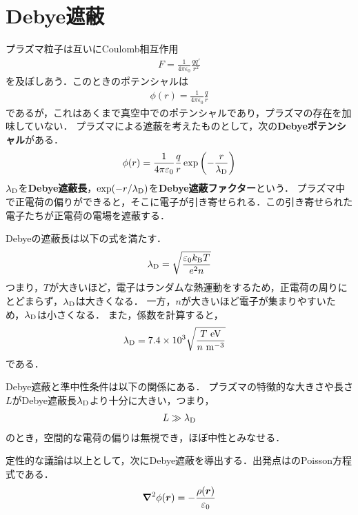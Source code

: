 \documentclass{report}
\begin{document}
  \section{Debye遮蔽}
    プラズマ粒子は互いにCoulomb相互作用
    \begin{align}
      F = \frac{1}{4\pi \epsilon_0}\frac{qq'}{r^2}
    \end{align}
    を及ぼしあう．このときのポテンシャルは
    \begin{align}
      \phi(r) = \frac{1}{4\pi \epsilon_0}\frac{q}{r}
    \end{align}
    であるが，これはあくまで真空中でのポテンシャルであり，プラズマの存在を加味していない．
    プラズマによる遮蔽を考えたものとして，次の\textbf{Debyeポテンシャル}がある．
    \begin{align}
      \phi(r) = \frac{1}{4\pi\varepsilon_0}\frac{q}{r}\exp\qty(-\frac{r}{\lambda_{\mathrm{D}}})
    \end{align}
    $\lambda_{\mathrm{D}}$を\textbf{Debye遮蔽長}，$\exp(-r/\lambda_{\mathrm{D}})$を\textbf{Debye遮蔽ファクター}という．
    プラズマ中で正電荷の偏りができると，そこに電子が引き寄せられる．この引き寄せられた電子たちが正電荷の電場を遮蔽する．
    \par
    Debyeの遮蔽長は以下の式を満たす．
    \begin{align}
      \lambda_{\mathrm{D}} = \sqrt{\frac{\varepsilon_0 k_{\mathrm{B}} T}{e^2 n}}
    \end{align}
    つまり，$T$が大きいほど，電子はランダムな熱運動をするため，正電荷の周りにとどまらず，$\lambda_{\mathrm{D}}$は大きくなる．
    一方，$n$が大きいほど電子が集まりやすいため，$\lambda_{\mathrm{D}}$は小さくなる．
    また，係数を計算すると，
    \begin{align}
      \lambda_{\r{D}} &= 7.4\times 10^3\sqrt{\frac{T\ \r{eV}}{n\ \r{m^{-3}}}}
    \end{align}
    である．
    \par
    Debye遮蔽と準中性条件は以下の関係にある．
    プラズマの特徴的な大きさや長さ$L$がDebye遮蔽長$\lambda_{\mathrm{D}}$より十分に大きい，つまり，
    \begin{align}
      L \gg \lambda_{\mathrm{D}}
    \end{align}
    のとき，空間的な電荷の偏りは無視でき，ほぼ中性とみなせる．
    \par
    定性的な議論は以上として，次にDebye遮蔽を導出する．出発点はのPoisson方程式である．
    \begin{align}
      \grad^2 \phi(\bm{r}) = -\frac{\rho(\bm{r})}{\varepsilon_0} \label{poisson-eq}
    \end{align}
\end{document}
